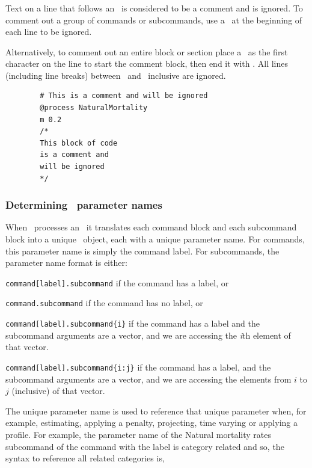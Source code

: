 \subsubsection{}
Text on a line that follows an \commentline\ is considered to be a comment and is ignored. To comment out a group of commands or subcommands, use a \commentline\ at the beginning of each line to be ignored.

Alternatively, to comment out an entire block or section place a \commentstart\ as the first character on the line to start the comment block, then end it with \commentend. All lines (including line breaks) between \commentstart\ and \commentend\ inclusive are ignored.
{\small{\begin{verbatim}
		# This is a comment and will be ignored
		@process NaturalMortality
		m 0.2
		/*
		This block of code
		is a comment and
		will be ignored
		*/
		\end{verbatim}}}

\subsubsection{Determining \CNAME\ parameter names\label{sec:parameter-names}}

When \CNAME\ processes an \config\ it translates each command block and each subcommand block into a unique \CNAME\ object, each with a unique parameter name. For commands, this parameter name is simply the command label. For subcommands, the parameter name format is either:

\begin{description}
\item \texttt{command[label].subcommand} if the command has a label, or
\item \texttt{command.subcommand} if the command has no label, or
\item \texttt{command[label].subcommand\{i\}} if the command has a label and the subcommand arguments are a vector, and we are accessing the  \emph{i}th element of that vector.
\item \texttt{command[label].subcommand\{i:j\}} if the command has a label, and the subcommand arguments are a vector, and we are accessing the elements from $i$ to $j$ (inclusive) of that vector.
\end{description}

The unique parameter name is used to reference that unique parameter when, for example, estimating, applying a penalty, projecting, time varying or applying a profile. For example, the parameter name of the Natural mortality rates subcommand  of the command  with the label  is category related and so, the syntax to reference all  related categories is,

